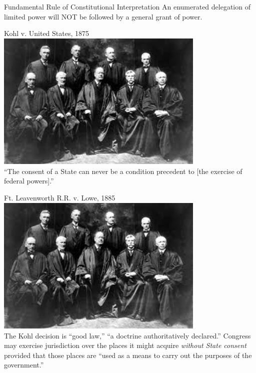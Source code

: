 \begin{frame}
    \begin{varblock}[.9\textwidth]{Fundamental Rule of Constitutional Interpretation}
        An enumerated delegation of limited power will NOT be followed by a general grant of power.
    \end{varblock}
\end{frame}

\begin{frame}{Kohl v. United States, 1875}
    \centering
    \includegraphics[width=0.75\textwidth]{img/sc-1905.png} \\
    { \large ``The consent of a State can never be a condition precedent to [the exercise of federal powers].'' }
\end{frame}

\begin{frame}{Ft. Leavenworth R.R. v. Lowe, 1885}
    \centering
    \includegraphics[width=0.75\textwidth]{img/sc-1905.png} \\
    The Kohl decision is ``good law,'' ``a doctrine authoritatively declared.'' Congress may exercise jurisdiction over the places it might acquire \emph{without State consent} provided that those places are ``used as a means to carry out the purposes of the government.''
\end{frame}

